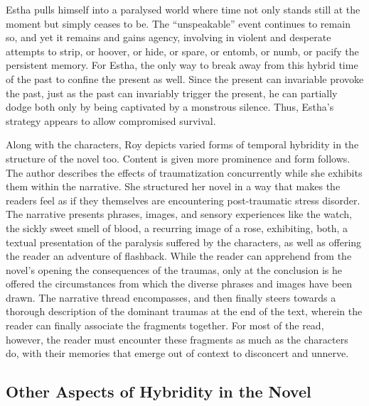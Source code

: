 Estha pulls himself into a paralysed world where time not only stands still at the moment but simply ceases to be. The “unspeakable” event continues to remain so, and yet it remains and gains agency, involving in violent and desperate attempts to strip, or hoover, or hide, or spare, or entomb, or numb, or pacify the persistent memory. For Estha, the only way to break away from this hybrid time of the past to confine the present as well. Since the present can invariable provoke the past, just as the past can invariably trigger the present, he can partially dodge both only by being captivated by a monstrous silence. Thus, Estha’s strategy appears to allow compromised survival.

Along with the characters, Roy depicts varied forms of temporal hybridity in the structure of the novel too. Content is given more prominence and form follows. The author describes the effects of traumatization concurrently while she exhibits them within the narrative. She structured her novel in a way that makes the readers feel as if they themselves are encountering post-traumatic stress disorder. The narrative presents phrases, images, and sensory experiences like the watch, the sickly sweet smell of blood, a recurring image of a rose, exhibiting, both, a textual presentation of the paralysis suffered by the characters, as well as offering the reader an adventure of flashback. While the reader can apprehend from the novel’s opening the consequences of the traumas, only at the conclusion is he offered the circumstances from which the diverse phrases and images have been drawn. The narrative thread encompasses, and then finally steers towards a thorough description of the dominant traumas at the end of the text, wherein the reader can finally associate the fragments together. For most of the read, however, the reader must encounter these fragments as much as the characters do, with their memories that emerge out of context to disconcert and unnerve. 

\subsection{Other Aspects of Hybridity in the Novel}

